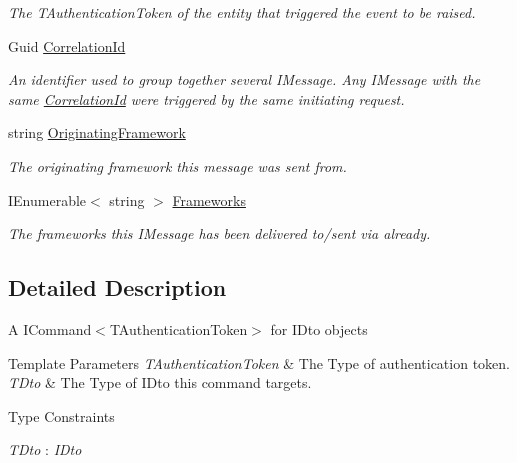\begin{DoxyCompactItemize}
\begin{DoxyCompactList}\small\item\em The {\itshape T\+Authentication\+Token}  of the entity that triggered the event to be raised. \end{DoxyCompactList}\item 
Guid \hyperlink{classCqrs_1_1Commands_1_1DtoCommand_aeb60eb40f2a201fd63e846d728768cdf_aeb60eb40f2a201fd63e846d728768cdf}{Correlation\+Id}
\begin{DoxyCompactList}\small\item\em An identifier used to group together several I\+Message. Any I\+Message with the same \hyperlink{classCqrs_1_1Commands_1_1DtoCommand_aeb60eb40f2a201fd63e846d728768cdf_aeb60eb40f2a201fd63e846d728768cdf}{Correlation\+Id} were triggered by the same initiating request. \end{DoxyCompactList}\item 
string \hyperlink{classCqrs_1_1Commands_1_1DtoCommand_a7272fbc4acb35942a1c5fb22cd3a6b9b_a7272fbc4acb35942a1c5fb22cd3a6b9b}{Originating\+Framework}
\begin{DoxyCompactList}\small\item\em The originating framework this message was sent from. \end{DoxyCompactList}\item 
I\+Enumerable$<$ string $>$ \hyperlink{classCqrs_1_1Commands_1_1DtoCommand_a2df20833afc756e5f7d553e4ed28406e_a2df20833afc756e5f7d553e4ed28406e}{Frameworks}
\begin{DoxyCompactList}\small\item\em The frameworks this I\+Message has been delivered to/sent via already. \end{DoxyCompactList}\end{DoxyCompactItemize}


\subsection{Detailed Description}
A I\+Command$<$\+T\+Authentication\+Token$>$ for I\+Dto objects 


\begin{DoxyTemplParams}{Template Parameters}
{\em T\+Authentication\+Token} & The Type of authentication token.\\
\hline
{\em T\+Dto} & The Type of I\+Dto this command targets.\\
\hline
\end{DoxyTemplParams}
\begin{Desc}
\item[Type Constraints]\begin{description}
\item[{\em T\+Dto} : {\em I\+Dto}]\end{description}
\end{Desc}


